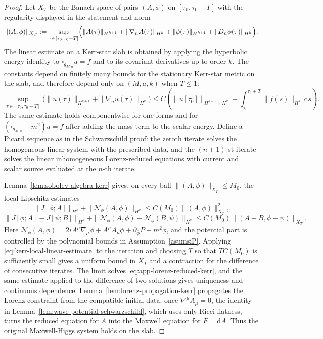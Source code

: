 \documentclass[11pt]{article}
\numberwithin{equation}{section}
\theoremstyle{plain}
\theoremstyle{definition}
\theoremstyle{remark}
\newcommand{\dd}{\mathrm{d}}
\begin{document}
\begin{proof}
Let \(X_T\) be the Banach space of pairs \((A,\phi)\) on \([\tau_0,\tau_0+T]\) with the regularity displayed in the statement and norm
\begin{equation}
 \|(A,\phi)\|_{X_T}:=\sup_{\tau\in[\tau_0,\tau_0+T]}
 \Bigl(\|A(\tau)\|_{H^{k+1}}+\|\nabla_nA(\tau)\|_{H^k}
 +\|\phi(\tau)\|_{H^{k+1}}+\|D_n\phi(\tau)\|_{H^k}\Bigr).
\end{equation}
The linear estimate on a Kerr-star slab is obtained by applying the hyperbolic energy identity to \(\square_{g_{M,a}}u=f\) and to its covariant derivatives up to order \(k\).  The constants depend on finitely many bounds for the stationary Kerr-star metric on the slab, and therefore depend only on \((M,a,k)\) when \(T\le1\):
\begin{equation}\label{eq:kerr-local-linear-estimate}
 \sup_{\tau\in[\tau_0,\tau_0+T]}
 \bigl(\|u(\tau)\|_{H^{k+1}}+\|\nabla_nu(\tau)\|_{H^k}\bigr)
 \le C\left(\|u[\tau_0]\|_{H^{k+1}\times H^k}
 +\int_{\tau_0}^{\tau_0+T}\|f(s)\|_{H^k}\,\dd s\right).
\end{equation}
The same estimate holds componentwise for one-forms and for \((\square_{g_{M,a}}-m^2)u=f\) after adding the mass term to the scalar energy.  Define a Picard sequence as in the Schwarzschild proof: the zeroth iterate solves the homogeneous linear system with the prescribed data, and the \((n+1)\)-st iterate solves the linear inhomogeneous Lorenz-reduced equations with current and scalar source evaluated at the \(n\)-th iterate.

Lemma~\ref{lem:sobolev-algebra-kerr} gives, on every ball \(\|(A,\phi)\|_{X_T}\le M_0\), the local Lipschitz estimates
\begin{equation}
 \|J[\phi;A]\|_{H^k}+\|\mathcal N_\phi(A,\phi)\|_{H^k}
 \le C(M_0)\|(A,\phi)\|_{X_T}^2,
\end{equation}
\begin{equation}
 \|J[\phi;A]-J[\psi;B]\|_{H^k}
 +\|\mathcal N_\phi(A,\phi)-\mathcal N_\phi(B,\psi)\|_{H^k}
 \le C(M_0)\|(A-B,\phi-\psi)\|_{X_T}.
\end{equation}
Here \(\mathcal N_\phi(A,\phi)=2iA^\mu\nabla_\mu\phi+A^\mu A_\mu\phi+\partial_{\bar\phi}P-m^2\phi\), and the potential part is controlled by the polynomial bounds in Assumption~\ref{asumsiP}.  Applying \eqref{eq:kerr-local-linear-estimate} to the iteration and choosing \(T\) so that \(T C(M_0)\) is sufficiently small gives a uniform bound in \(X_T\) and a contraction for the difference of consecutive iterates.  The limit solves \eqref{eq:app-lorenz-reduced-kerr}, and the same estimate applied to the difference of two solutions gives uniqueness and continuous dependence.  Lemma~\ref{lem:lorenz-propagation-kerr} propagates the Lorenz constraint from the compatible initial data; once \(\nabla^\mu A_\mu=0\), the identity in Lemma~\ref{lem:wave-potential-schwarzschild}, which uses only Ricci flatness, turns the reduced equation for \(A\) into the Maxwell equation for \(F=\dd A\).  Thus the original Maxwell-Higgs system holds on the slab.
\end{proof}
\end{document}
